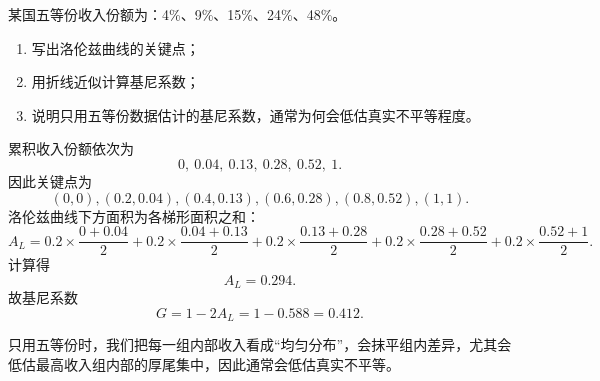 \begin{question}
某国五等份收入份额为：4\%、9\%、15\%、24\%、48\%。
\begin{enumerate}[label=(\alph*),leftmargin=2.5em]
  \item 写出洛伦兹曲线的关键点；
  \item 用折线近似计算基尼系数；
  \item 说明只用五等份数据估计的基尼系数，通常为何会低估真实不平等程度。
\end{enumerate}
\begin{solution}
累积收入份额依次为
\[
0,\ 0.04,\ 0.13,\ 0.28,\ 0.52,\ 1.
\]
因此关键点为
\[
(0,0),(0.2,0.04),(0.4,0.13),(0.6,0.28),(0.8,0.52),(1,1).
\]
洛伦兹曲线下方面积为各梯形面积之和：
\[
A_L=0.2\times\frac{0+0.04}{2}+0.2\times\frac{0.04+0.13}{2}+0.2\times\frac{0.13+0.28}{2}+0.2\times\frac{0.28+0.52}{2}+0.2\times\frac{0.52+1}{2}.
\]
计算得
\[
A_L=0.294.
\]
故基尼系数
\[
G=1-2A_L=1-0.588=0.412.
\]

只用五等份时，我们把每一组内部收入看成“均匀分布”，会抹平组内差异，尤其会低估最高收入组内部的厚尾集中，因此通常会低估真实不平等。\end{solution}
\end{question}

